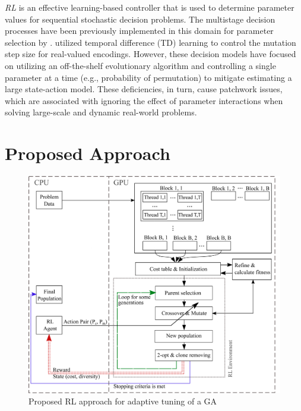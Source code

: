 \documentclass[acmsmall]{acmart}
\begin{document}
\textit{RL} is an effective learning-based controller that is used to determine parameter values for sequential stochastic decision problems. The multistage decision processes have been previously implemented in this domain for parameter selection by \cite{sakurai2010method, pettinger2002controlling, chen2005scga}. \cite{muller2002step} utilized temporal difference (TD) learning to control the mutation step size for real-valued encodings. However, these decision models have focused on utilizing an off-the-shelf evolutionary algorithm and controlling a single parameter at a time (e.g., probability of permutation) to mitigate estimating a large state-action model. These deficiencies, in turn, cause patchwork issues, which are associated with ignoring the effect of parameter interactions when solving large-scale and dynamic real-world problems.

\section{Proposed Approach}\label{sec:proposed-approach}

\begin{figure}
\begin{centering}
\includegraphics[scale=0.35]{figs/RL_GPU_implementation.pdf}
\par\end{centering}
\begin{centering}
\caption{Proposed RL approach for adaptive tuning of a GA\label{fig:RL-GPU}}
\par\end{centering}
\end{figure}
\end{document}
